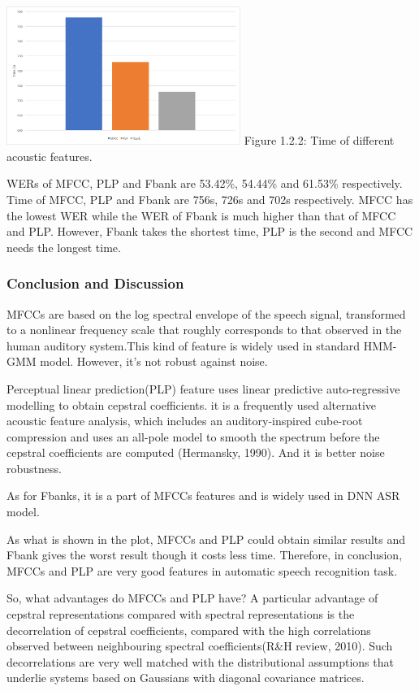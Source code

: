 \documentclass[]{article}
\begin{document}
\begin{multicols*}{2}
\begin{center}
\includegraphics[width=3in]{Picture1.png} 
Figure 1.2.2: Time of different acoustic features.
\end{center}

WERs of MFCC, PLP and Fbank are 53.42\%, 54.44\% and 61.53\% respectively. Time of MFCC, PLP and Fbank are 756s, 726s and 702s respectively. MFCC has the lowest WER while the WER of Fbank is much higher than that of MFCC and PLP. However, Fbank takes the shortest time, PLP is the second and MFCC needs the longest time.

\subsubsection{Conclusion and Discussion}

MFCCs are based on the log spectral envelope of the speech signal, transformed to a nonlinear frequency scale that roughly corresponds to that observed in the human auditory system.This kind of feature is widely used in standard HMM-GMM model. However, it's not robust against noise.

Perceptual linear prediction(PLP) feature uses linear predictive auto-regressive modelling to obtain cepstral coefficients. it is a frequently used alternative acoustic feature analysis, which  includes an auditory-inspired cube-root compression and uses an all-pole model to smooth the spectrum before the cepstral coefficients are computed (Hermansky, 1990). And it is better noise robustness.

As for Fbanks, it is a part of MFCCs features and is widely used in DNN ASR model.

As what is shown in the plot, MFCCs and PLP could obtain similar results and Fbank gives the worst result though it costs less time. Therefore, in conclusion, MFCCs and PLP are very good features in automatic speech recognition task.

So, what advantages do MFCCs and PLP have? A particular advantage of cepstral representations compared with spectral representations is the decorrelation of cepstral  coefficients,  compared  with  the  high  correlations  observed  between neighbouring spectral coefficients(R\&H review, 2010). Such decorrelations are very well matched with the distributional assumptions that underlie systems based on Gaussians with diagonal covariance matrices.


\end{multicols*}
\end{document}
